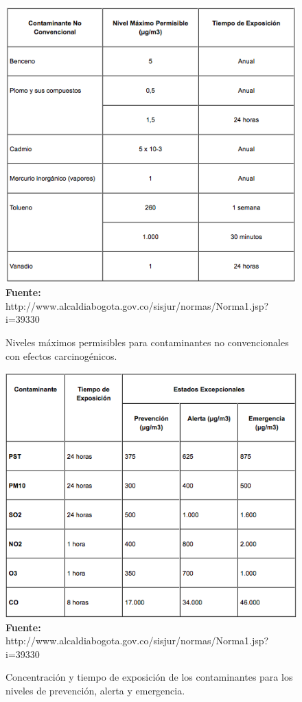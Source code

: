 \documentclass[a4paper,openright,12pt]{book}
\theoremstyle{definition}
\theoremstyle{remark}
\begin{document}
\begin{figure}[h]
\centering
\caption{Niveles máximos permisibles para contaminantes no convencionales con efectos carcinogénicos.} 
\includegraphics[scale=0.56]{Norma2}
\\\textbf{Fuente:} http://www.alcaldiabogota.gov.co/sisjur/normas/Norma1.jsp?i=39330
\label{fig:Ubicacion}
\end{figure}

\begin{figure}[htp]
\centering
\caption{Concentración y tiempo de exposición de los contaminantes para los niveles de prevención, alerta y emergencia.} 
\includegraphics[scale=0.56]{Norma4}
\\\textbf{Fuente:} http://www.alcaldiabogota.gov.co/sisjur/normas/Norma1.jsp?i=39330
\label{fig:Ubicacion}
\end{figure}
\end{document}
